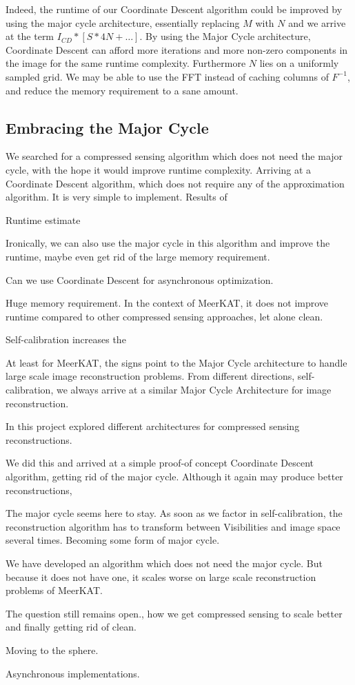 Indeed, the runtime of our Coordinate Descent algorithm could be improved by using the major cycle architecture, essentially replacing $M$ with $N$ and we arrive at the term $I_{CD} * [S * 4N +\ldots]$. By using the Major Cycle architecture, Coordinate Descent can afford more iterations and more non-zero components in the image for the same runtime complexity. Furthermore $N$ lies on a uniformly sampled grid. We may be able to use the FFT instead of caching columns of $F^{-1}$, and reduce the memory requirement to a sane amount.

\subsection{Embracing the Major Cycle}
We searched for a compressed sensing algorithm which does not need the major cycle, with the hope it would improve runtime complexity. Arriving at a Coordinate Descent algorithm, which does not require any of the approximation algorithm. It is very simple to implement. Results of 

Runtime estimate

Ironically, we can also use the major cycle in this algorithm and improve the runtime, maybe even get rid of the large memory requirement.

Can we use Coordinate Descent for asynchronous optimization.

Huge memory requirement. In the context of MeerKAT, it does not improve runtime compared to other compressed sensing approaches, let alone clean.

Self-calibration increases the 

At least for MeerKAT, the signs point to the Major Cycle architecture to handle large scale image reconstruction problems. From different directions, self-calibration, we always arrive at a similar Major Cycle Architecture for image reconstruction.






In this project explored different architectures for compressed sensing reconstructions. 

We did this and arrived at a simple proof-of concept Coordinate Descent algorithm, getting rid of the major cycle. Although it again may produce better reconstructions,

The major cycle seems here to stay. As soon as we factor in self-calibration, the reconstruction algorithm has to transform between Visibilities and image space several times. Becoming some form of major cycle.

We have developed an algorithm which does not need the major cycle. But because it does not have one, it scales worse on large scale reconstruction problems of MeerKAT.

The question still remains open., how we get compressed sensing to scale better and finally getting rid of clean. 

Moving to the sphere.

Asynchronous implementations.
 
